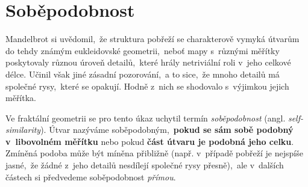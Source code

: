 \section{Soběpodobnost}\label{sec:sobepodobnost}
Mandelbrot si uvědomil,~že struktura pobřeží se charakterově vymyká útvarům do tehdy známým eukleidovské geometrii,~neboť mapy s~různými měřítky poskytovaly různou úroveň detailů,~které hrály netriviální roli v~jeho celkové délce. Učinil však jiné zásadní pozorování,~a to sice,~že mnoho detailů má společné rysy,~které se opakují. Hodně z~nich se shodovalo s~výjimkou jejich měřítka. \citep[str. 96]{Mandelbrot1983}\par

Ve fraktální geometrii se pro tento úkaz uchytil termín \emph{soběpodobnost} (angl. \emph{self-similarity}). Útvar nazýváme soběpodobným,~\textbf{pokud se sám sobě podobný v~libovolném měřítku} \citep[str. 220]{Voracova2022} nebo pokud \textbf{část útvaru je podobná jeho celku}. Zmíněná podoba může být míněna přibližně (např. v~případě pobřeží je nejspíše jasné,~že žádné z~jeho detailů nesdílejí společné rysy přesně),~ale v~dalších částech si předvedeme soběpodobnost \emph{přímou}.

